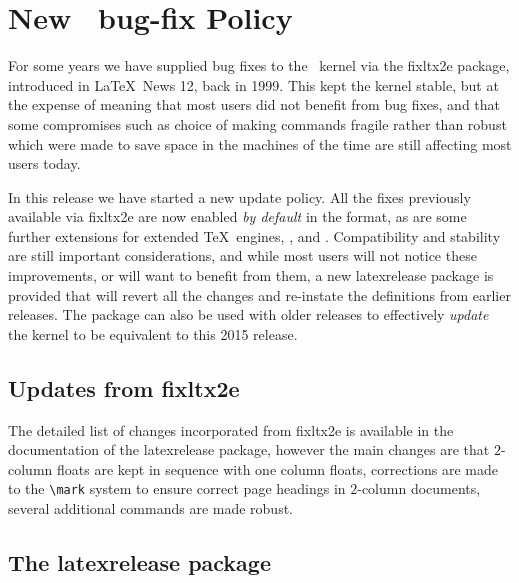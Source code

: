 \documentclass{ltnews}
\begin{document}
\maketitle

\tableofcontents

\bigskip

\section{New \LaTeXe\ bug-fix Policy}

For some years we have supplied bug fixes to the \LaTeXe\ kernel via the
\textsf{fixltx2e} package, introduced in \LaTeX\ News 12, back in 1999. This
kept the kernel stable, but at the expense of meaning that most users did not
benefit from bug fixes, and that some compromises such as choice of making
commands fragile rather than robust which were made to save space in the
machines of the time are still affecting most users today.

In this release we have started a new update policy. All the fixes previously
available via \textsf{fixltx2e} are now enabled \emph{by default} in the
format, as are some further extensions for extended \TeX\ engines, \eTeX,
 and . Compatibility and stability are still
important considerations, and while most users will not notice these
improvements, or will want to benefit from them, a new \textsf{latexrelease}
package is provided that will revert all the changes and re-instate the
definitions from earlier releases. The package can also be used with older
releases to effectively \emph{update} the kernel to be equivalent to this 2015
release.

\subsection{Updates from \textsf{fixltx2e}}

The detailed list of changes incorporated from \textsf{fixltx2e} is available
in the documentation of the \textsf{latexrelease} package, however the main
changes are that $2$-column floats are kept in sequence with one column floats,
corrections are made to the \verb|\mark| system to ensure correct page headings
in $2$-column documents, several additional commands are made robust.

\subsection{The \textsf{latexrelease} package}
\end{document}
